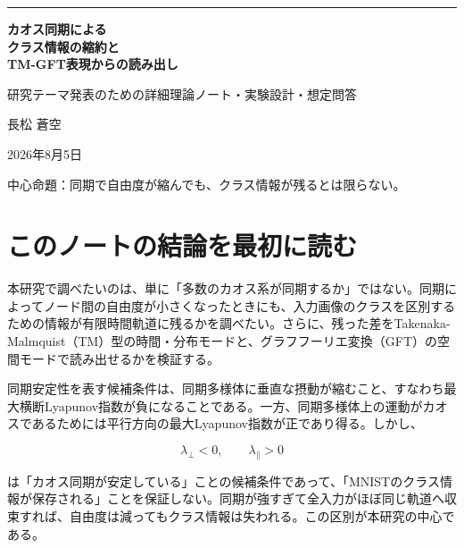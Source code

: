 \documentclass[11pt,a4paper]{ltjsarticle}
\begin{document}
\begin{titlepage}
\pagecolor{researchnavy}
\color{white}
\vspace*{27mm}
{\color{researchblue}\rule{26mm}{2pt}}\par
\vspace{10mm}
{\fontsize{25}{36}\selectfont\bfseries
カオス同期による\\
クラス情報の縮約と\\
TM-GFT表現からの読み出し\par}
\vspace{10mm}
{\large 研究テーマ発表のための詳細理論ノート・実験設計・想定問答\par}
\vfill
{\large 長松 蒼空\par}
{\normalsize 2026年8月5日\par}
\vspace{18mm}
{\large 中心命題：同期で自由度が縮んでも、クラス情報が残るとは限らない。\par}
\end{titlepage}
\nopagecolor
\color{researchink}
\setcounter{page}{1}

\tableofcontents
\clearpage
\section*{\textcolor{researchink}{このノートの結論を最初に読む}}


本研究で調べたいのは、単に「多数のカオス系が同期するか」ではない。同期によってノード間の自由度が小さくなったときにも、入力画像のクラスを区別するための情報が有限時間軌道に残るかを調べたい。さらに、残った差をTakenaka-Malmquist（TM）型の時間・分布モードと、グラフフーリエ変換（GFT）の空間モードで読み出せるかを検証する。\par

同期安定性を表す候補条件は、同期多様体に垂直な摂動が縮むこと、すなわち最大横断Lyapunov指数が負になることである。一方、同期多様体上の運動がカオスであるためには平行方向の最大Lyapunov指数が正であり得る。しかし、\par

\[
\lambda_{\perp}<0,\qquad \lambda_{\parallel}>0
\]

は「カオス同期が安定している」ことの候補条件であって、「MNISTのクラス情報が保存される」ことを保証しない。同期が強すぎて全入力がほぼ同じ軌道へ収束すれば、自由度は減ってもクラス情報は失われる。この区別が本研究の中心である。\par
\end{document}
